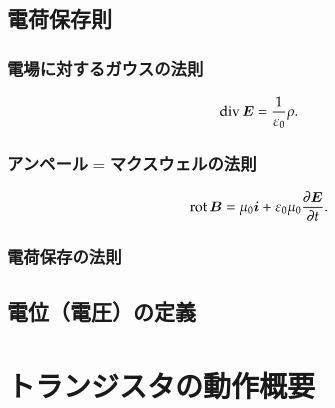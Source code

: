     \subsection{電荷保存則}
        \subsubsection{電場に対するガウスの法則}
            \begin{align}
                \mathrm{div}\, \boldsymbol{E} = \frac{1}{\varepsilon_{0}}\rho.
            \end{align}

        \subsubsection{アンペール$=$マクスウェルの法則}
            \begin{align}
                \mathrm{rot}\, \boldsymbol{B} = \mu_{0}\boldsymbol{i} + \varepsilon_{0}\mu_{0}\frac{\partial \boldsymbol{E}}{\partial t}.
            \end{align}

        \subsubsection{電荷保存の法則}

    \subsection{電位（電圧）の定義}

    \section{トランジスタの動作概要}
